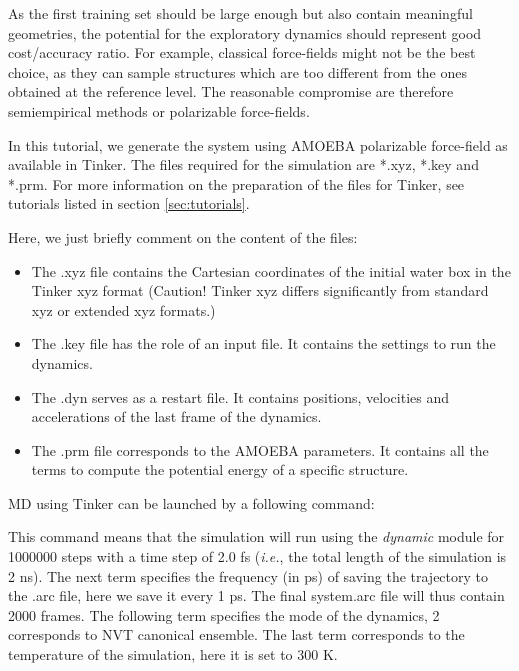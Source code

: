 \documentclass[12pt]{article}
\begin{document}

As the first training set should be large enough but also contain meaningful geometries, the potential for the exploratory dynamics should represent good cost/accuracy ratio. For example, classical force-fields might not be the best choice, as they can sample structures which are too different from the ones obtained at the reference level. The reasonable compromise are therefore semiempirical methods or polarizable force-fields.

In this tutorial, we generate the system using AMOEBA polarizable force-field as available in Tinker. The files required for the simulation are *.xyz,  *.key and *.prm. For more information on the preparation of the files for Tinker, see tutorials listed in section \ref{sec:tutorials}.

Here, we just briefly comment on the content of the files:

\begin{itemize}
    \item The .xyz file contains the Cartesian coordinates of the initial water box in the Tinker xyz format (Caution! Tinker xyz differs significantly from standard xyz or extended xyz formats.)  
    \item The .key file has the role of an input file. It contains the settings to run the dynamics.
    \item The .dyn serves as a restart file. It contains positions, velocities and accelerations of the last frame of the dynamics.
    \item The .prm file corresponds to the AMOEBA parameters. It contains all the terms to compute the potential energy of a specific structure.
\end{itemize}

MD using Tinker can be launched by a following command:
\begin{center}
\end{center}
This command means that the simulation will run using the \textit{dynamic} module for 1000000 steps with a time step of 2.0 fs (\textit{i.e.}, the total length of the simulation is 2 ns). The next term specifies the frequency (in ps) of saving the trajectory to the .arc file, here we save it every 1 ps. The final system.arc file will thus contain 2000 frames. The following term specifies the mode of the dynamics, 2 corresponds to NVT canonical ensemble. The last term corresponds to the temperature of the simulation, here it is set to 300 K. 
\end{document}
